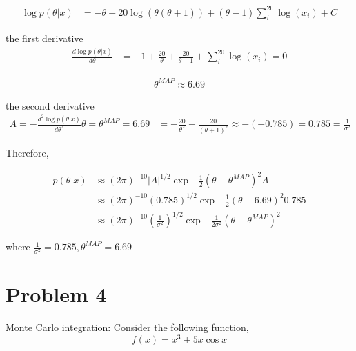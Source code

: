 \documentclass{article}
\begin{document}
\begin{equation}
\begin{aligned}
    \log p(\theta | x) 
    &= -\theta + 20 \log(\theta(\theta+1))+(\theta-1)\sum_{i}^{20}\log(x_{i})+C
\end{aligned}
\end{equation}

the first derivative
\begin{equation}
\begin{aligned}
    \frac{d \log p(\theta | x) }{d \theta}
    &= -1 + \frac{20}{\theta} +\frac{20}{\theta+1}+\sum_{i}^{20}\log(x_{i}) = 0
\end{aligned}
\end{equation}

\begin{equation}
\begin{aligned}
    \theta^{MAP} \approx 6.69
\end{aligned}
\end{equation}

the second derivative
\begin{equation}
\begin{aligned}
    A = -\frac{d^2 \log p(\theta | x) }{d \theta^2}{\theta=\theta^{MAP}=6.69}
    &= - \frac{20}{\theta^2} -\frac{20}{(\theta+1)^2} \approx -(-0.785) = 0.785 = \frac{1}{\sigma^2}
\end{aligned}
\end{equation}

Therefore,

\begin{equation}
\begin{aligned}
    p(\theta | x) 
    &\approx (2\pi)^{-10} |A|^{1/2}\exp{-\frac{1}{2}(\theta - \theta^{MAP})^{2} A} \\
    &\approx (2\pi)^{-10} (0.785)^{1/2}\exp{-\frac{1}{2}(\theta - 6.69)^{2} 0.785} \\
    &\approx (2\pi)^{-10} (\frac{1}{\sigma^2})^{1/2}\exp{-\frac{1}{2\sigma^2}(\theta - \theta^{MAP})^{2} }
\end{aligned}
\end{equation}

where $\frac{1}{\sigma^2}= 0.785,\theta^{MAP}=6.69 $

\newpage
\section{Problem 4}
Monte Carlo integration: Consider the following function,
\begin{equation}
    f(x) = x^{3} + 5x \cos{x}
\end{equation}
\end{document}
